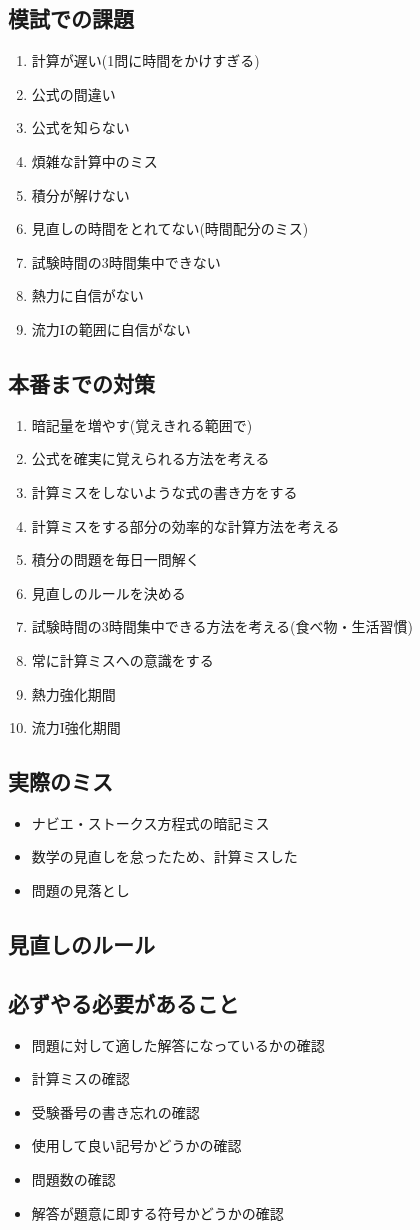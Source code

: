 \documentclass[a4paper]{jsarticle}
\begin{document}
\subsection{模試での課題}
\begin{enumerate}[(1)]
    \item 計算が遅い(1問に時間をかけすぎる)
    \item 公式の間違い
    \item 公式を知らない
    \item 煩雑な計算中のミス
    \item 積分が解けない
    \item 見直しの時間をとれてない(時間配分のミス)
    \item 試験時間の3時間集中できない
    \item 熱力に自信がない
    \item 流力Iの範囲に自信がない
\end{enumerate}
\subsection{本番までの対策}
\begin{enumerate}[(1)]
    \item 暗記量を増やす(覚えきれる範囲で)
    \item 公式を確実に覚えられる方法を考える
    \item 計算ミスをしないような式の書き方をする
    \item 計算ミスをする部分の効率的な計算方法を考える
    \item 積分の問題を毎日一問解く
    \item 見直しのルールを決める
    \item 試験時間の3時間集中できる方法を考える(食べ物・生活習慣)
    \item 常に計算ミスへの意識をする
    \item 熱力強化期間
    \item 流力I強化期間
\end{enumerate}
\subsection{実際のミス}
\begin{itemize}
    \item ナビエ・ストークス方程式の暗記ミス
    \item 数学の見直しを怠ったため、計算ミスした
    \item 問題の見落とし
\end{itemize}
\subsection{見直しのルール}
\subsection{必ずやる必要があること}
\begin{itemize}
    \item 問題に対して適した解答になっているかの確認
    \item 計算ミスの確認
    \item 受験番号の書き忘れの確認
    \item 使用して良い記号かどうかの確認
    \item 問題数の確認
    \item 解答が題意に即する符号かどうかの確認
\end{itemize}
\end{document}
